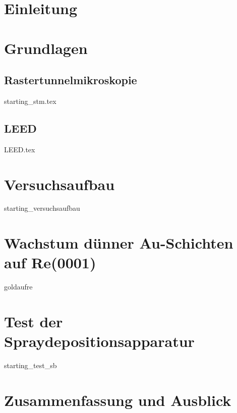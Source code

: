 \documentclass[pdftex,a4paper,german,openbib,final,11pt,twoside,chapterprefix,
headsepline]{scrbook}
\begin{document}
\mainmatter  
\sloppy


\chapter{Einleitung}





\chapter{Grundlagen}


\section{Rastertunnelmikroskopie}
{starting_stm.tex}
 \section{LEED}
 {LEED.tex}


 \chapter{Versuchsaufbau} 
 {starting_versuchsaufbau}
 
\chapter{Wachstum dünner Au-Schichten auf Re(0001)}
{goldaufre}
 
\chapter{Test der Spraydepositionsapparatur} \label{kaptest}
{starting_test_sb}



% 
\chapter{Zusammenfassung und Ausblick}



% 
% 


{}



% 
\end{document}
